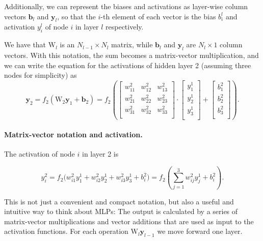 \documentclass[%
oneside,                 %
final,                   %
10pt]{article}
\begin{document}
Additionally, we can represent the biases and activations
as layer-wise column vectors $\boldsymbol{b}_l$ and $\boldsymbol{y}_l$, so that the $i$-th element of each vector 
is the bias $b_i^l$ and activation $y_i^l$ of node $i$ in layer $l$ respectively. 

We have that $\mathrm{W}_l$ is an $N_{l-1} \times N_l$ matrix, while $\boldsymbol{b}_l$ and $\boldsymbol{y}_l$ are $N_l \times 1$ column vectors. 
With this notation, the sum becomes a matrix-vector multiplication, and we can write
the equation for the activations of hidden layer 2 (assuming three nodes for simplicity) as
\begin{equation}
 \boldsymbol{y}_2 = f_2(\mathrm{W}_2 \boldsymbol{y}_{1} + \boldsymbol{b}_{2}) = 
 f_2\left(\left[\begin{array}{ccc}
    w^2_{11} &w^2_{12} &w^2_{13} \\
    w^2_{21} &w^2_{22} &w^2_{23} \\
    w^2_{31} &w^2_{32} &w^2_{33} \\
    \end{array} \right] \cdot
    \left[\begin{array}{c}
           y^1_1 \\
           y^1_2 \\
           y^1_3 \\
          \end{array}\right] + 
    \left[\begin{array}{c}
           b^2_1 \\
           b^2_2 \\
           b^2_3 \\
          \end{array}\right]\right).
\end{equation}

\paragraph{Matrix-vector notation  and activation.}
The activation of node $i$ in layer 2 is

\begin{equation}
 y^2_i = f_2\Bigr(w^2_{i1}y^1_1 + w^2_{i2}y^1_2 + w^2_{i3}y^1_3 + b^2_i\Bigr) = 
 f_2\left(\sum_{j=1}^3 w^2_{ij} y_j^1 + b^2_i\right).
\end{equation}

This is not just a convenient and compact notation, but also a useful
and intuitive way to think about MLPs: The output is calculated by a
series of matrix-vector multiplications and vector additions that are
used as input to the activation functions. For each operation
$\mathrm{W}_l \boldsymbol{y}_{l-1}$ we move forward one layer.
\end{document}
